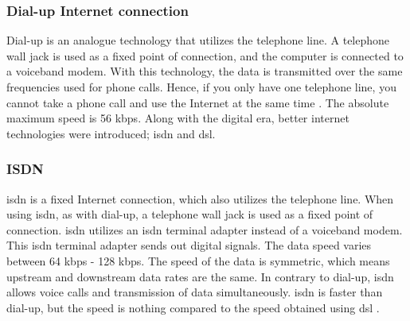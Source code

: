 \subsubsection{Dial-up Internet connection}
Dial-up is an analogue technology that utilizes the telephone line. A telephone wall jack is used as a fixed point of connection, and the computer is connected to a voiceband modem. With this technology, the data is transmitted over the same frequencies used for phone calls. Hence, if you only have one telephone line, you cannot take a phone call and use the Internet at the same time \cite{differentuplinks}. The absolute maximum speed is 56 \gls{kbps}. Along with the digital era, better internet technologies were introduced; \gls{isdn} and \gls{dsl}. 

\subsubsection{ISDN}
\gls{isdn} is a fixed Internet connection, which also utilizes the telephone line. When using \gls{isdn}, as with dial-up, a telephone wall jack is used as a fixed point of connection. \gls{isdn} utilizes an \gls{isdn} terminal adapter instead of a voiceband modem. This \gls{isdn} terminal adapter sends out digital signals. The data speed varies between 64 \gls{kbps} - 128 \gls{kbps}. The speed of the data is symmetric, which means upstream and downstream data rates are the same. In contrary to dial-up, \gls{isdn} allows voice calls and transmission of data simultaneously. \gls{isdn} is faster than dial-up, but the speed is nothing compared to the speed obtained using \gls{dsl} \cite{differentuplinks}. 

